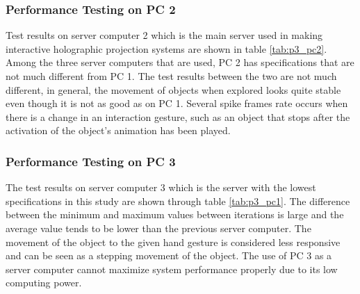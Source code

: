 \documentclass[conference]{IEEEtran}
\begin{document}
		\subsubsection{Performance Testing on PC 2}
		Test results on server computer 2 which is the main server used in making interactive holographic projection systems are shown in table \ref{tab:p3_pc2}. Among the three server computers that are used, PC 2 has specifications that are not much different from PC 1. The test results between the two are not much different, in general, the movement of objects when explored looks quite stable even though it is not as good as on PC 1. Several spike frames rate occurs when there is a change in an interaction gesture, such as an object that stops after the activation of the object's animation has been played. 
		
		\subsubsection{ Performance Testing on PC 3}
		The test results on server computer 3 which is the server with the lowest specifications in this study are shown through table \ref{tab:p3_pc1}. The difference between the minimum and maximum values between iterations is large and the average value tends to be lower than the previous server computer. The movement of the object to the given hand gesture is considered less responsive and can be seen as a stepping movement of the object. The use of PC 3 as a server computer cannot maximize system performance properly due to its low computing power.
		
\end{document}
